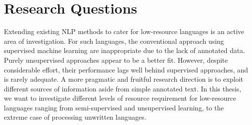 \documentclass[12pt,twoside,final,hidelinks]{ltthesis}
\theoremstyle{definition}
\begin{document}


\section{Research Questions}
Extending existing NLP methods to cater for low-resource languages is an active area of investigation. For such languages, the conventional approach using supervised machine learning are inappropriate due to the lack of annotated data. Purely unsupervised approaches appear to be a better fit. However, despite considerable effort, their performance lags well behind supervised approaches, and is rarely adequate. A more pragmatic and fruitful research direction is to exploit different sources of information aside from simple annotated text. In this thesis, we want to investigate different levels of resource requirement for low-resource languages ranging from semi-supervised and unsupervised learning, to the extreme case of processing unwritten languages. 
\end{document}
